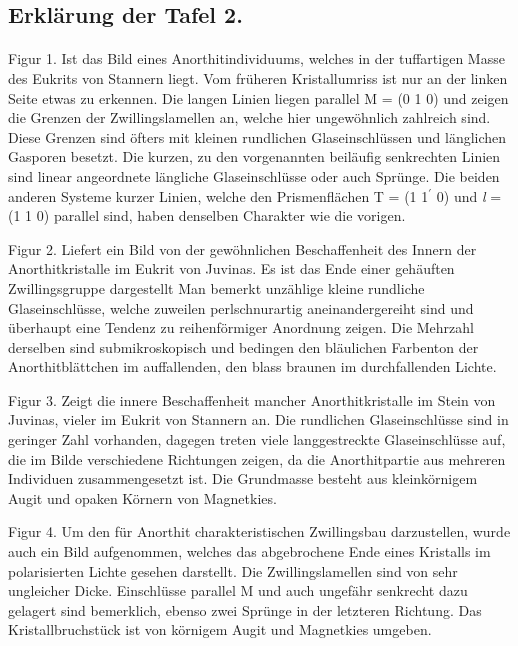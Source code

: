 \documentclass[a4paper, 12pt, oneside]{article}
\begin{document}
\subsection{Erklärung der Tafel 2.}
\paragraph{}
Figur 1. Ist das Bild eines Anorthitindividuums, welches in der tuffartigen Masse des Eukrits von Stannern liegt. Vom früheren Kristallumriss ist nur an der linken Seite etwas zu erkennen. Die langen Linien liegen parallel M = (0 1 0) und zeigen die Grenzen der Zwillingslamellen an, welche hier ungewöhnlich zahlreich sind. Diese Grenzen sind öfters mit kleinen rundlichen Glaseinschlüssen und länglichen Gasporen besetzt. Die kurzen, zu den vorgenannten beiläufig senkrechten Linien sind linear angeordnete längliche Glaseinschlüsse oder auch Sprünge. Die beiden anderen Systeme kurzer Linien, welche den Prismenflächen T = (1 1$^{\prime}$ 0) und \emph{l} = (1 1 0) parallel sind, haben denselben Charakter wie die vorigen.

Figur 2. Liefert ein Bild von der gewöhnlichen Beschaffenheit des Innern der Anorthitkristalle im Eukrit von Juvinas. Es ist das Ende einer gehäuften Zwillingsgruppe dargestellt Man bemerkt unzählige kleine rundliche Glaseinschlüsse, welche zuweilen perlschnurartig aneinandergereiht sind und überhaupt eine Tendenz zu reihenförmiger Anordnung zeigen. Die Mehrzahl derselben sind submikroskopisch und bedingen den bläulichen Farbenton der Anorthitblättchen im auffallenden, den blass braunen im durchfallenden Lichte.

Figur 3. Zeigt die innere Beschaffenheit mancher Anorthitkristalle im Stein von Juvinas, vieler im Eukrit von Stannern an. Die rundlichen Glaseinschlüsse sind in geringer Zahl vorhanden, dagegen treten viele langgestreckte Glaseinschlüsse auf, die im Bilde verschiedene Richtungen zeigen, da die Anorthitpartie aus mehreren Individuen zusammengesetzt ist. Die Grundmasse besteht aus kleinkörnigem Augit und opaken Körnern von Magnetkies.

Figur 4. Um den für Anorthit charakteristischen Zwillingsbau darzustellen, wurde auch ein Bild aufgenommen, welches das abgebrochene Ende eines Kristalls im polarisierten Lichte gesehen darstellt. Die Zwillingslamellen sind von sehr ungleicher Dicke. Einschlüsse parallel M und auch ungefähr senkrecht dazu gelagert sind bemerklich, ebenso zwei Sprünge in der letzteren Richtung. Das Kristallbruchstück ist von körnigem Augit und Magnetkies umgeben.
\clearpage
\end{document}
